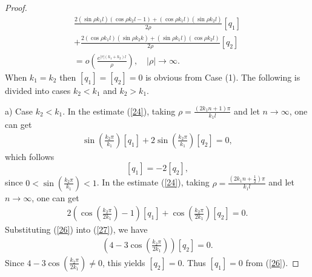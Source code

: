 \documentclass[reqno,11pt,centertags]{amsart}
\numberwithin{equation}{section}
\theoremstyle{definition}
\begin{document}
\begin{proof}
\begin{align}\label{24}
 \frac{2(\sin\rho k_{1}l)(\cos\rho k_{2}l-1)+(\cos\rho k_{1}l)(\sin\rho k_{2}l)}{2\rho}[q_{1}]\!\!\!\!\! \nonumber \\
 +\frac{2(\cos\rho k_{1}l)(\sin\rho k_{2}k)+(\sin\rho k_{1}l)(\cos\rho k_{2}l)}{2\rho}[q_{2}] \nonumber \\
 =o\left(\frac{e^{|\tau|(k_{1}+k_{2})l}}{\rho}\right),\quad |\rho|\rightarrow\infty.\qquad\qquad\qquad\;\;\;\:
\end{align}
When $k_{1}=k_{2}$ then $[q_{1}]=[q_{2}]=0$ is obvious from Case (1). The following is divided into cases $k_{2}<k_{1}$ and $k_{2}>k_{1}$.

a) Case $k_{2}<k_{1}$.
In the estimate (\ref{24}), taking $\rho=\frac{(2k_{1}n+1)\pi}{k_{1}l}$ and let $n\rightarrow\infty$, one can get
\begin{align}\label{25}
 \sin\left(\frac{k_{2}\pi}{k_{1}}\right)[q_{1}]+2\sin\left(\frac{k_{2}\pi}{k_{1}}\right)[q_{2}]=0,
\end{align}
which follows
\begin{equation}\label{26}
  [q_{1}]=-2[q_{2}],
\end{equation}
since $0<\sin\left(\frac{k_{2}\pi}{k_{1}}\right)<1$.
In the estimate (\ref{24}), taking $\rho=\frac{(2k_{1}n+\frac{1}{2})\pi}{k_{1}l}$ and let $n\rightarrow\infty$, one can get
\begin{align}\label{27}
 2\left(\cos\left(\frac{k_{2}\pi}{2k_{1}}\right)-1\right)[q_{1}]+\cos\left(\frac{k_{2}\pi}{2k_{1}}\right)[q_{2}]=0.
\end{align}
Substituting (\ref{26}) into (\ref{27}), we have
\begin{align}
 \left(4-3\cos\left(\frac{k_{2}\pi}{2k_{1}}\right)\right)[q_{2}]=0. \nonumber
\end{align}
Since $4-3\cos\left(\frac{k_{2}\pi}{2k_{1}}\right)\neq0$, this yields $[q_{2}]=0$. Thus $[q_{1}]=0$ from (\ref{26}).


\end{proof}
\end{document}
